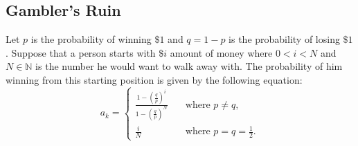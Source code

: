 \documentclass[10pt]{article}
\theoremstyle{remark}
\theoremstyle{plain}
\newcommand{\N}{\mathbb{N}}
\numberwithin{equation}{section}
\begin{document}
\subsection{Gambler's Ruin}
Let $p$ is the probability of winning $\$1$ and $q = 1 - p$ is the probability of losing $\$1$. Suppose that a person starts with $\$i$ amount of money where $0 < i < N$ and $N \in \N$ is the number he would want to walk away with. The probability of him winning from this starting position is given by the following equation:
	\[ a_k =
		\begin{cases}
			\frac{1-\left(\frac{q}{p}\right)^i}{1 - \left(\frac{q}{p}\right)^N} \quad & \text{where } p \neq q,\\
			\frac{i}{N}  &  \text{where } p = q = \frac{1}{2}.
		\end{cases}
	\]
	
\end{document}
